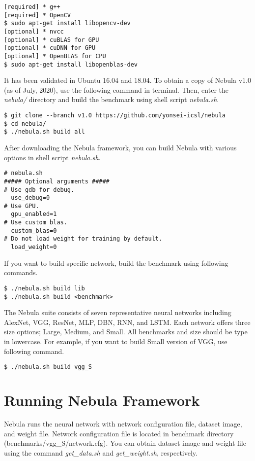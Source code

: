 \documentclass[10pt]{article}
\begin{document}
\begin{Verbatim}[frame=single,fontsize=\small]
[required] * g++
[required] * OpenCV
$ sudo apt-get install libopencv-dev
[optional] * nvcc
[optional] * cuBLAS for GPU 
[optional] * cuDNN for GPU
[optional] * OpenBLAS for CPU
$ sudo apt-get install libopenblas-dev
\end{Verbatim}

It has been validated in Ubuntu 16.04 and 18.04.
To obtain a copy of Nebula v1.0 (as of July, 2020), use the following command in terminal.
Then, enter the \emph{nebula/} directory and build the benchmark using shell script \emph{nebula.sh}.

\begin{Verbatim}[frame=single,fontsize=\small]
$ git clone --branch v1.0 https://github.com/yonsei-icsl/nebula
$ cd nebula/
$ ./nebula.sh build all
\end{Verbatim}

After downloading the Nebula framework, you can build Nebula with various options in shell script \emph{nebula.sh}.

\begin{Verbatim}[frame=single,fontsize=\small]
# nebula.sh
##### Optional arguments #####
# Use gdb for debug.
  use_debug=0
# Use GPU.
  gpu_enabled=1
# Use custom blas.
  custom_blas=0
# Do not load weight for training by default.
  load_weight=0
\end{Verbatim}
If you want to build specific network, build the benchmark using following commands.
\begin{Verbatim}[frame=single,fontsize=\small]
$ ./nebula.sh build lib
$ ./nebula.sh build <benchmark>
\end{Verbatim}
The Nebula suite consists of seven representative neural networks including AlexNet, VGG, ResNet, MLP, DBN, RNN, and LSTM.
Each network offers three size options; Large, Medium, and Small.
All benchmarks and size should be type in lowercase.
For example, if you want to build Small version of VGG, use following command.

\begin{Verbatim}[frame=single,fontsize=\small]
$ ./nebula.sh build vgg_S
\end{Verbatim}

\section{Running Nebula Framework} \label{sec:running}

Nebula runs the neural network with network configuration file, dataset image, and weight file.
Network configuration file is located in benchmark directory (benchmarks/vgg_S/network.cfg).
You can obtain dataset image and weight file using the command \emph{get\_data.sh} and \emph{get\_weight.sh}, respectively.
\end{document}
